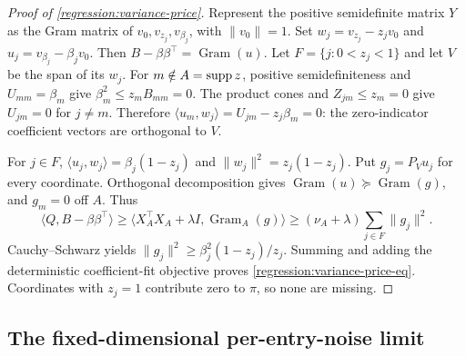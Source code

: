 \begin{proof}[Proof of \cref{regression:variance-price}]
Represent the positive semidefinite matrix $Y$ as the Gram
matrix of $v_0,v_{z_j},v_{\beta_j}$, with $\|v_0\|=1$.
Set $w_j=v_{z_j}-z_jv_0$ and
$u_j=v_{\beta_j}-\beta_jv_0$.
Then $B-\beta\beta^\top=\operatorname{Gram}(u)$.
Let $F=\{j:0<z_j<1\}$ and let $V$ be the span of its $w_j$.
For $m\notin A=\operatorname{supp} z$, positive semidefiniteness and
$U_{mm}=\beta_m$ give $\beta_m^2\leq z_mB_{mm}=0$.
The product cones and $Z_{jm}\leq z_m=0$ give $U_{jm}=0$
for $j\ne m$. Therefore
$\langle u_m,w_j\rangle=U_{jm}-z_j\beta_m=0$:
the zero-indicator coefficient vectors are orthogonal to $V$.

For $j\in F$,
$\langle u_j,w_j\rangle=\beta_j(1-z_j)$ and
$\|w_j\|^2=z_j(1-z_j)$.
Put $g_j=P_Vu_j$ for every coordinate.
Orthogonal decomposition gives
$\operatorname{Gram}(u)\succeq\operatorname{Gram}(g)$,
and $g_m=0$ off $A$.
Thus
\[
 \langle Q,B-\beta\beta^\top\rangle
 \geq\langle X_A^\top X_A+\lambda I,\operatorname{Gram}_A(g)\rangle
 \geq(\nu_A+\lambda)\sum_{j\in F}\|g_j\|^2.
\]
Cauchy--Schwarz yields
$\|g_j\|^2\geq\beta_j^2(1-z_j)/z_j$.
Summing and adding the deterministic coefficient-fit objective
proves \eqref{regression:variance-price-eq}. Coordinates with
$z_j=1$ contribute zero to $\pi$, so none are missing.
\end{proof}

\subsection{The fixed-dimensional per-entry-noise limit}
\label{app:regression:pwe}

